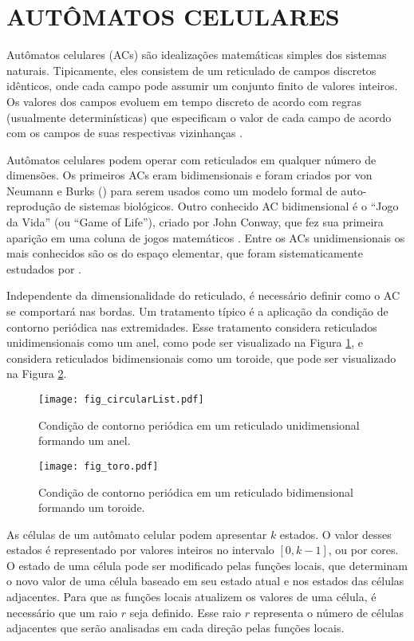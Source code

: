 \section{AUTÔMATOS CELULARES}
\label{sec:acs}
Autômatos celulares (ACs) são idealizações matemáticas simples dos sistemas naturais. Tipicamente, eles consistem de um reticulado de campos discretos idênticos, onde cada campo pode assumir um conjunto finito de valores inteiros. Os valores dos campos evoluem em tempo discreto de acordo com regras (usualmente determinísticas) que especificam o valor de cada campo de acordo com os campos de suas respectivas vizinhanças \cite{wolfram1994cellular}.

Autômatos celulares podem operar com reticulados em qualquer número de dimensões. Os primeiros ACs eram bidimensionais e foram criados por von Neumann e Burks (\citeyear{neumann1966theory}) para serem usados como um modelo formal de auto-reprodução de sistemas biológicos. Outro conhecido AC bidimensional é o ``Jogo da Vida'' (ou ``Game of Life''), criado por John Conway, que fez sua primeira aparição em uma coluna de jogos matemáticos \cite{GardnerM1970}. Entre os ACs unidimensionais os mais conhecidos são os do espaço elementar, que foram sistematicamente estudados por .

Independente da dimensionalidade do reticulado, é necessário definir como o AC se comportará nas bordas. Um tratamento típico é a aplicação da condição de contorno periódica nas extremidades. Esse tratamento considera reticulados unidimensionais como um anel, como pode ser visualizado na Figura \ref{fig:anel}, e considera reticulados bidimensionais como um toroide, que pode ser visualizado na Figura \ref{fig:toro}.  
	\begin{figure}[h!]
	  \centering
	  \texttt{[image: fig\_circularList.pdf]}
	  \caption{Condição de contorno periódica em um reticulado unidimensional formando um anel.}
	  \label{fig:anel}
	\end{figure}

	\begin{figure}[h!]
	  \centering
  	  \texttt{[image: fig\_toro.pdf]}
	  \caption{Condição de contorno periódica em um reticulado bidimensional formando um toroide.}
	  \label{fig:toro}
	\end{figure}

As células de um autômato celular podem apresentar $k$ estados. O valor desses estados é representado por valores inteiros no intervalo $[0, k-1]$, ou por cores. O estado de uma célula pode ser modificado pelas funções locais, que determinam o novo valor de uma célula baseado em seu estado atual e nos estados das células adjacentes. %
Para que as funções locais atualizem os valores de uma célula, é necessário que um raio $r$ seja definido. Esse raio $r$ representa o número de células adjacentes que serão analisadas em cada direção pelas funções locais.%


